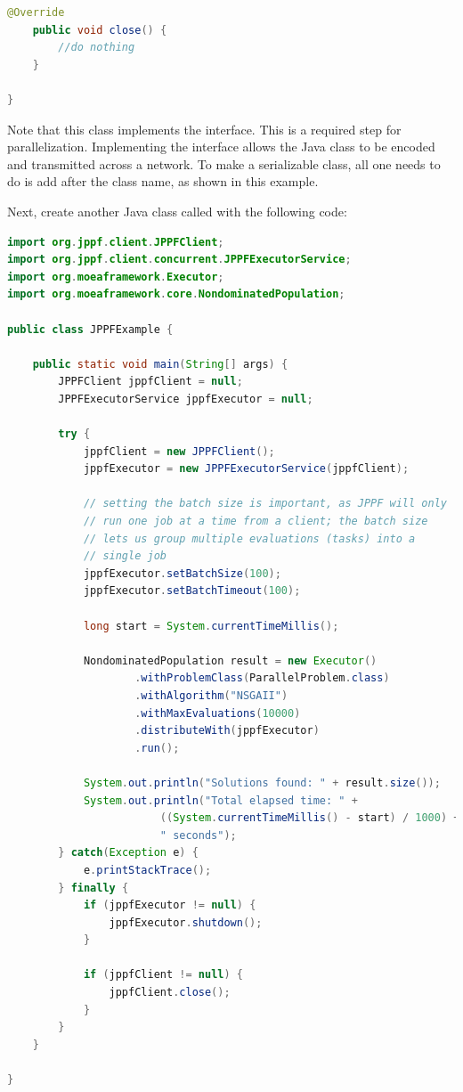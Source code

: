 {\begin{lstlisting}[language=Java]
	@Override
	public void close() {
		//do nothing
	}

}
\end{lstlisting}

\begin{tip}
Note that this class implements the  interface.  This is a required step for parallelization.  Implementing the  interface allows the Java class to be encoded and transmitted across a network.  To make a serializable class, all one needs to do is add  after the class name, as shown in this example.
\end{tip}

Next, create another Java class called  with the following code:

\begin{lstlisting}[language=Java]
import org.jppf.client.JPPFClient;
import org.jppf.client.concurrent.JPPFExecutorService;
import org.moeaframework.Executor;
import org.moeaframework.core.NondominatedPopulation;

public class JPPFExample {

	public static void main(String[] args) {
		JPPFClient jppfClient = null;
		JPPFExecutorService jppfExecutor = null;

		try {
			jppfClient = new JPPFClient();
			jppfExecutor = new JPPFExecutorService(jppfClient);
			
			// setting the batch size is important, as JPPF will only
			// run one job at a time from a client; the batch size
			// lets us group multiple evaluations (tasks) into a
			// single job
			jppfExecutor.setBatchSize(100);
			jppfExecutor.setBatchTimeout(100);
			
			long start = System.currentTimeMillis();

			NondominatedPopulation result = new Executor()
					.withProblemClass(ParallelProblem.class)
					.withAlgorithm("NSGAII")
					.withMaxEvaluations(10000)
					.distributeWith(jppfExecutor)
					.run();
			
			System.out.println("Solutions found: " + result.size());
			System.out.println("Total elapsed time: " + 
						((System.currentTimeMillis() - start) / 1000) +
						" seconds");
		} catch(Exception e) {
			e.printStackTrace();
		} finally {
			if (jppfExecutor != null) {
				jppfExecutor.shutdown();
			}

			if (jppfClient != null) {
				jppfClient.close();
			}
		}
	}
	
}
\end{lstlisting}

}
